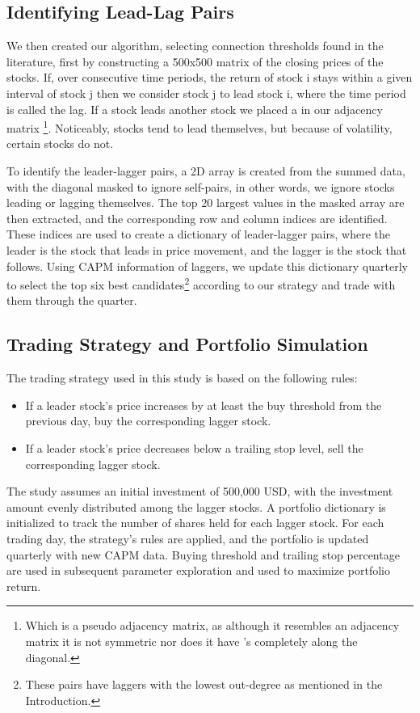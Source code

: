 \documentclass{article}
\begin{document}
\subsection{Identifying Lead-Lag Pairs}
We then created our algorithm, selecting connection thresholds found in the literature, first by constructing a 500x500 matrix of the closing prices of the stocks. If, over consecutive time periods, the return of stock {\selectfont
i} stays within a given interval of stock {\selectfont
j} then we consider stock {\selectfont
j} to lead stock {\selectfont
i}, where the time period is called the lag. If a stock leads another stock we placed a {} in our adjacency matrix \footnote{Which is a pseudo adjacency matrix, as although it resembles an adjacency matrix it is not symmetric nor does it have {}'s completely along the diagonal.}. Noticeably, stocks tend to lead themselves, but because of volatility, certain stocks do not. 

To identify the leader-lagger pairs, a 2D array is created from the summed data, with the diagonal masked to ignore self-pairs, in other words, we ignore stocks leading or lagging themselves. The top 20 largest values in the masked array are then extracted, and the corresponding row and column indices are identified. These indices are used to create a dictionary of leader-lagger pairs, where the leader is the stock that leads in price movement, and the lagger is the stock that follows. Using CAPM information of laggers, we update this dictionary quarterly to select the top six best candidates\footnote{These pairs have laggers with the lowest out-degree as mentioned in the Introduction.} according to our strategy and trade with them through the quarter. 
\subsection{Trading Strategy and Portfolio Simulation}
The trading strategy used in this study is based on the following rules:
\begin{itemize}
    \item If a leader stock's price increases by at least the buy threshold from the previous day, buy the corresponding lagger stock.
    \item If a leader stock's price decreases below a trailing stop level, sell the corresponding lagger stock.
\end{itemize}
The study assumes an initial investment of 500,000 USD, with the investment amount evenly distributed among the lagger stocks. A portfolio dictionary is initialized to track the number of shares held for each lagger stock. For each trading day, the strategy's rules are applied, and the portfolio is updated quarterly with new CAPM data. Buying threshold and trailing stop percentage are used in subsequent parameter exploration and used to maximize portfolio return.
\end{document}
